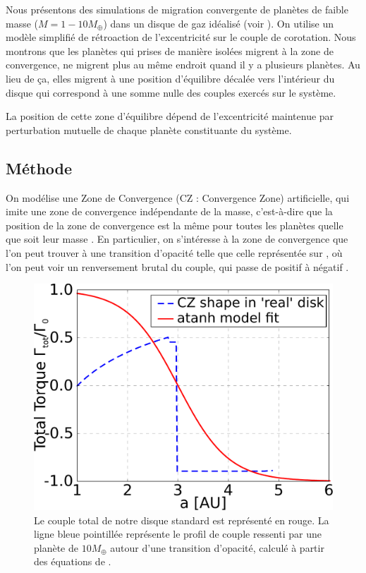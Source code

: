 \bigskip

Nous présentons des simulations de migration convergente de planètes de faible masse ($M=1-10\unit{M_\oplus}$) dans un disque de
gaz idéalisé (voir ). On utilise un modèle simplifié de rétroaction de l'excentricité sur le couple de
corotation. Nous montrons que les planètes qui prises de manière isolées migrent à la zone de convergence, ne migrent plus au
même endroit quand il y a plusieurs planètes. Au lieu de ça, elles migrent à une position d'équilibre décalée vers l'intérieur
du disque qui correspond à une somme nulle des couples exercés sur le système. 

La position de cette zone d'équilibre dépend de l'excentricité maintenue par perturbation mutuelle de chaque planète constituante du système.

\subsection{Méthode}
On modélise une Zone de Convergence (CZ : Convergence Zone) artificielle, qui imite une zone de convergence indépendante de la masse, c'est-à-dire que la position de la zone de convergence est la même pour toutes les planètes quelle que soit leur masse . En particulier, on s'intéresse à la zone de convergence que l'on peut trouver à une transition d'opacité telle que celle représentée sur , où l'on peut voir un renversement brutal du couple, qui passe de positif à négatif \citep[voir par exemple ][]{masset2011type}.

\begin{figure}[htbp]
\centering
\includegraphics[width=0.49\linewidth]{figure/shifted/torque_zoom_CZ1.pdf}
\caption[Modélisation artificielle d'une zone de convergence.]{Le couple total de notre disque standard est représenté en rouge.
La ligne bleue pointillée représente le profil de couple ressenti par une planète de $10\unit{M_\oplus}$ autour d'une transition
d'opacité, calculé à partir des équations de \cite{paardekooper2011torque}.}\label{fig:shifted_CZ_torque_prof}
\end{figure}

